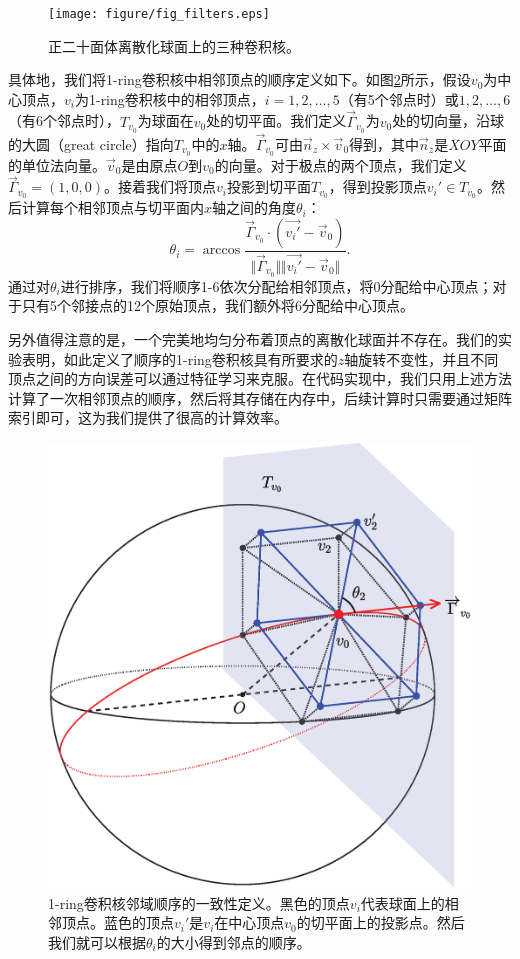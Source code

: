 \begin{figure}[!t]
	\centering
	\texttt{[image: figure/fig\_filters.eps]}
	\caption{正二十面体离散化球面上的三种卷积核。}
	\label{fig:fig_filters}
\end{figure}

具体地，我们将1-ring卷积核中相邻顶点的顺序定义如下。如图\ref{fig:figure_1_ring_projection_on_tangent_plane}所示，假设$v_0$为中心顶点，$v_i$为1-ring卷积核中的相邻顶点，$i=1,2,\dots,5$（有5个邻点时）或$1,2,\dots,6$（有6个邻点时），$T_{v_0}$为球面在$v_0$处的切平面。我们定义$\vec{\Gamma}_{v_0}$为$v_0$处的切向量，沿球的大圆（great circle）指向$T_{v_0}$中的$x$轴。$\vec{\Gamma}_{v_0}$可由$\vec{n}_z\times \vec{v}_0$得到，其中$\vec{n}_z$是$XOY$平面的单位法向量。$\vec{v}_0$是由原点$O$到$v_0$的向量。对于极点的两个顶点，我们定义$\vec{\Gamma}_{v_0}=(1,0,0)$。接着我们将顶点$v_i$投影到切平面$T_{v_0}$，得到投影顶点$v_i'\in T_{v_0}$。然后计算每个相邻顶点与切平面内$x$轴之间的角度$\theta_i$：
\begin{equation}
\theta_i=\arccos{\frac{\vec{\Gamma}_{v_0} \cdot (\vec{v_i'}-\vec{v}_0)}{\Vert{\vec{\Gamma}_{v_0}}\Vert\Vert{\vec{v_i'}-\vec{v}_0}\Vert}}.
\end{equation}
通过对$\theta_i$进行排序，我们将顺序1-6依次分配给相邻顶点，将0分配给中心顶点；对于只有5个邻接点的12个原始顶点，我们额外将6分配给中心顶点。

另外值得注意的是，一个完美地均匀分布着顶点的离散化球面并不存在\cite{lee2019spherephd}。我们的实验表明，如此定义了顺序的1-ring卷积核具有所要求的$z$轴旋转不变性，并且不同顶点之间的方向误差可以通过特征学习来克服\cite{lee2019spherephd,liu2018deep,zhao2019spherical_ipmi,jiang2018spherical}。在代码实现中，我们只用上述方法计算了一次相邻顶点的顺序，然后将其存储在内存中，后续计算时只需要通过矩阵索引即可，这为我们提供了很高的计算效率。

\begin{figure}[!t]
	\centering
	\includegraphics[width=0.45\linewidth]{figure/figure_1_ring_projection_on_tangent_plane.eps}
	\caption{1-ring卷积核邻域顺序的一致性定义。黑色的顶点$v_i$代表球面上的相邻顶点。蓝色的顶点$v_i'$是$v_i$在中心顶点$v_0$的切平面上的投影点。然后我们就可以根据$\theta_i$的大小得到邻点的顺序。}
	\label{fig:figure_1_ring_projection_on_tangent_plane}
\end{figure}


